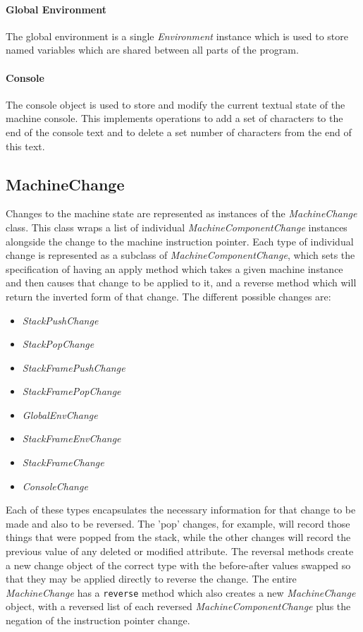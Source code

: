 \paragraph{Global Environment}

The global environment is a single \textit{Environment} instance which is used to store named variables which are shared between all parts of the program.

\paragraph{Console}

The console object is used to store and modify the current textual state of the machine console. This implements operations to add a set of characters to the end of the console text and to delete a set number of characters from the end of this text.

\subsection{MachineChange}

Changes to the machine state are represented as instances of the \textit{MachineChange} class. This class wraps a list of individual \textit{MachineComponentChange} instances alongside the change to the machine instruction pointer. Each type of individual change is represented as a subclass of \textit{MachineComponentChange}, which sets the specification of having an apply method which takes a given machine instance and then causes that change to be applied to it, and a reverse method which will return the inverted form of that change. The different possible changes are:

\begin{itemize}
\item \textit{StackPushChange}
\item \textit{StackPopChange}
\item \textit{StackFramePushChange}
\item \textit{StackFramePopChange}
\item \textit{GlobalEnvChange}
\item \textit{StackFrameEnvChange}
\item \textit{StackFrameChange}
\item \textit{ConsoleChange}
\end{itemize}

Each of these types encapsulates the necessary information for that change to be made and also to be reversed. The 'pop' changes, for example, will record those things that were popped from the stack, while the other changes will record the previous value of any deleted or modified attribute. The reversal methods create a new change object of the correct type with the before-after values swapped so that they may be applied directly to reverse the change. The entire \textit{MachineChange} has a \verb+reverse+ method which also creates a new \textit{MachineChange} object, with a reversed list of each reversed \textit{MachineComponentChange} plus the negation of the instruction pointer change.

